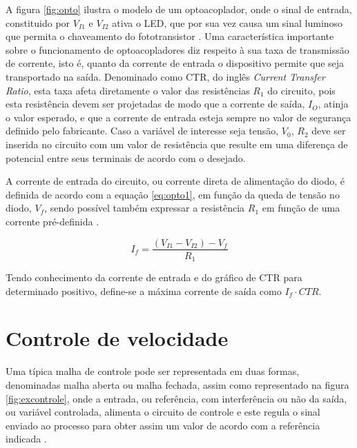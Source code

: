 A figura \ref{fig:opto} ilustra o modelo de um optoacoplador, onde o 
sinal de entrada, constituido por $V_{I1}$ e $V_{I2}$ ativa o LED, que
por sua vez causa um sinal luminoso que permita o chaveamento do 
fototransistor \cite{bishop2001understand}. Uma característica importante
sobre o funcionamento de optoacopladores diz respeito à sua taxa de 
transmissão de corrente, isto é, quanto da corrente de entrada o 
dispositivo permite que seja transportado na saída. Denominado como 
CTR, do inglês \textit{Current Transfer Ratio}, esta taxa afeta
diretamente o valor das resistências $R_1$ do circuito, 
pois esta resistência devem ser projetadas de modo que a corrente de 
saída, $I_O$, atinja o valor esperado, e que a corrente de entrada 
esteja sempre no valor de segurança definido pelo fabricante. Caso a 
variável de interesse seja tensão, $V_0$, $R_2$ deve ser inserida no 
circuito com um valor de resistência que resulte em uma diferença de
potencial entre seus terminais de acordo com o desejado.

A corrente de entrada do circuito, ou corrente direta de alimentação 
do diodo, é definida de acordo com a equação \ref{eq:opto1}, em função
da queda de tensão no diodo, $V_f$, sendo possível também expressar a 
resistência $R_1$ em função de uma corrente pré-definida \cite{sedra1998microelectronic}.

\begin{equation}
    \label{eq:opto1}
    I_f = \frac{\left(V_{I1}-V_{I2}\right) - V_f}{R_1}
\end{equation}

Tendo conhecimento da corrente de entrada e do gráfico de CTR para 
determinado positivo, define-se a máxima corrente de saída como
$I_f \cdot CTR$. 

\section{Controle de velocidade}
Uma típica malha de controle pode ser representada em duas formas, denominadas malha aberta ou malha fechada, assim como representado na figura \ref{fig:excontrole},
onde a entrada, ou referência, com interferência ou não da saída, ou variável controlada, alimenta o circuito de controle e este regula o sinal enviado ao processo
para obter assim um valor de acordo com a referência indicada \cite{nise2011control}. 

